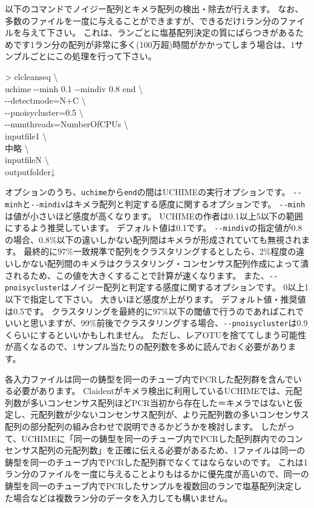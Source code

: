 \documentclass[titlepage,10pt,a4paper,english]{jsbook}
\newenvironment{cmd}{\begin{oframed}\raggedright\ttfamily\footnotesize\setlength{\baselineskip}{1.4em}}{\end{oframed}\vspace{-1em}}
\begin{document}
以下のコマンドでノイジー配列とキメラ配列の検出・除去が行えます。
なお、多数のファイルを一度に与えることができますが、できるだけ1ラン分のファイルを与えて下さい。
これは、ランごとに塩基配列決定の質にばらつきがあるためです1ラン分の配列が非常に多く(100万超)時間がかかってしまう場合は、1サンプルごとにこの処理を行って下さい。
\begin{cmd}
{\textgreater} clcleanseq {\textbackslash}\\
uchime {-}{-}minh 0.1 {-}{-}mindiv 0.8 end {\textbackslash}\\
{-}{-}detectmode=N+C {\textbackslash}\\
{-}{-}pnoisycluster=0.5 {\textbackslash}\\
{-}{-}numthreads=NumberOfCPUs {\textbackslash}\\
inputfile1 {\textbackslash}\\
中略 {\textbackslash}\\
inputfileN {\textbackslash}\\
outputfolder↓
\end{cmd}
オプションのうち、\texttt{uchime}から\texttt{end}の間はUCHIMEの実行オプションです。
\texttt{{-}{-}minh}と\texttt{{-}{-}mindiv}はキメラ配列と判定する感度に関するオプションです。
\texttt{{-}{-}minh}は値が小さいほど感度が高くなります。
UCHIMEの作者は0.1以上5以下の範囲にするよう推奨しています。
デフォルト値は0.1です。
\texttt{{-}{-}mindiv}の指定値が0.8の場合、0.8\%以下の違いしかない配列間はキメラが形成されていても無視されます。
最終的に97\%一致規準で配列をクラスタリングするとしたら、2\%程度の違いしかない配列間のキメラはクラスタリング・コンセンサス配列作成によって潰されるため、この値を大きくすることで計算が速くなります。
また、\texttt{{-}{-}pnoisycluster}はノイジー配列と判定する感度に関するオプションです。
0以上1以下で指定して下さい。
大きいほど感度が上がります。
デフォルト値・推奨値は0.5です。
クラスタリングを最終的に97\%以下の閾値で行うのであればこれでいいと思いますが、99\%前後でクラスタリングする場合、\texttt{{-}{-}pnoisycluster}は0.9くらいにするといいかもしれません。
ただし、レアOTUを捨ててしまう可能性が高くなるので、1サンプル当たりの配列数を多めに読んでおく必要があります。

各入力ファイルは同一の鋳型を同一のチューブ内でPCRした配列群を含んでいる必要があります。
Claidentがキメラ検出に利用しているUCHIMEでは、元配列数が多いコンセンサス配列ほどPCR当初から存在した＝キメラではないと仮定し、元配列数が少ないコンセンサス配列が、より元配列数の多いコンセンサス配列の部分配列の組み合わせで説明できるかどうかを検討します。
したがって、UCHIMEに「同一の鋳型を同一のチューブ内でPCRした配列群内でのコンセンサス配列の元配列数」を正確に伝える必要があるため、1ファイルは同一の鋳型を同一のチューブ内でPCRした配列群でなくてはならないのです。
これは1ラン分のファイルを一度に与えることよりもはるかに優先度が高いので、同一の鋳型を同一のチューブ内でPCRしたサンプルを複数回のランで塩基配列決定した場合などは複数ラン分のデータを入力しても構いません。
\end{document}
